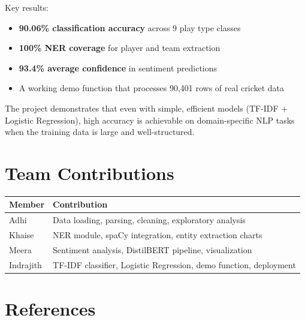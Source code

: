\documentclass[12pt,a4paper]{article}
\begin{document}
Key results:
\begin{itemize}[leftmargin=1.5em]
  \item \textbf{90.06\% classification accuracy} across 9 play type classes
  \item \textbf{100\% NER coverage} for player and team extraction
  \item \textbf{93.4\% average confidence} in sentiment predictions
  \item A working demo function that processes 90,401 rows of real cricket data
\end{itemize}

The project demonstrates that even with simple, efficient models (TF-IDF + Logistic Regression), high accuracy is achievable on domain-specific NLP tasks when the training data is large and well-structured.

\section*{Team Contributions}

\begin{table}[H]
\centering
\begin{tabular}{ll}
\toprule
\textbf{Member} & \textbf{Contribution} \\
\midrule
Adhi      & Data loading, parsing, cleaning, exploratory analysis \\
Khaise    & NER module, spaCy integration, entity extraction charts \\
Meera     & Sentiment analysis, DistilBERT pipeline, visualization \\
Indrajith & TF-IDF classifier, Logistic Regression, demo function, deployment \\
\bottomrule
\end{tabular}
\end{table}

\section*{References}
\end{document}
